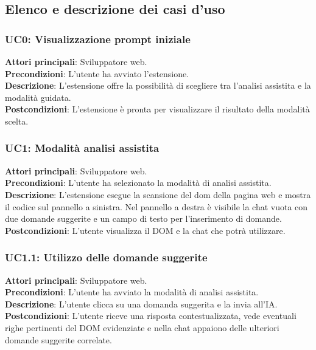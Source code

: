 \subsection{Elenco e descrizione dei casi d'uso}
\subsubsection*{UC0: Visualizzazione prompt iniziale}
\noindent \textbf{Attori principali}: Sviluppatore web.\\
\textbf{Precondizioni}: L'utente ha avviato l’estensione.\\
\textbf{Descrizione}: L’estensione offre la possibilità di scegliere tra l’analisi assistita e la modalità guidata.\\
\textbf{Postcondizioni}: L’estensione è pronta per visualizzare il risultato della modalità scelta.\\

\subsubsection*{UC1: Modalità analisi assistita}
\noindent \textbf{Attori principali}: Sviluppatore web.\\
\textbf{Precondizioni}: L’utente ha selezionato la modalità di analisi assistita.\\
\textbf{Descrizione}: L’estensione esegue la scansione del \acrshort{dom} della pagina web e mostra il codice sul pannello a sinistra. Nel pannello a destra è visibile la chat vuota con due domande suggerite e un campo di testo per l'inserimento di domande.\\
\textbf{Postcondizioni}: L’utente visualizza il DOM e la chat che potrà utilizzare.\\

\subsubsection*{UC1.1: Utilizzo delle domande suggerite}
\noindent \textbf{Attori principali}: Sviluppatore web.\\
\textbf{Precondizioni}: L’utente ha avviato la modalità di analisi assistita.\\
\textbf{Descrizione}: L’utente clicca su una domanda suggerita e la invia all'IA.\\
\textbf{Postcondizioni}: L’utente riceve una risposta contestualizzata, vede eventuali righe pertinenti del DOM evidenziate e nella chat appaiono delle ulteriori domande suggerite correlate.


